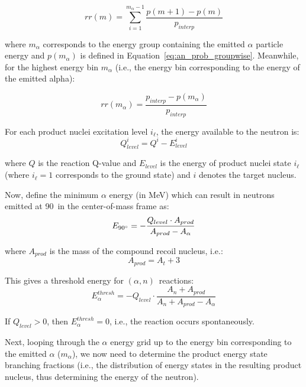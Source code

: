 \documentclass[10pt]{article}
\newcommand{\alphn}[0]{$\left(\alpha,n\right)$}
\begin{document}
\begin{equation}
rr\left(m\right) = \sum_{i=1}^{m_\alpha-1} \frac{ p\left(m+1\right) - p\left(m\right) }{p_{interp}} 
\end{equation}

where $m_\alpha$ corresponds to the energy group containing the emitted $\alpha$ particle energy and $p\left(m_\alpha\right)$ is defined in Equation~\eqref{eq:an_prob_groupwise}. Meanwhile, for the highest energy bin $m_\alpha$ (i.e., the energy bin corresponding to the energy of the emitted alpha):

\begin{equation}
rr\left(m_\alpha\right)=\frac{p_{interp} - p\left( m_\alpha\right) }{p_{interp}}
\end{equation}

For each product nuclei excitation level $i_\ell$, the energy available to the neutron is:
\begin{equation}
Q_{level}^i = Q^i-E^i_{level}
\end{equation}

where $Q$ is the reaction Q-value and $E_{level}$ is the energy of product nuclei state $i_\ell$ (where $i_\ell=1$ corresponds to the ground state) and $i$ denotes the target nucleus.

Now, define the minimum $\alpha$ energy (in MeV) which can result in neutrons emitted at 90\degree\ in the center-of-mass frame as:
\begin{equation}
E_{90\degree} = -\frac{Q_{level} \cdot A_{prod}}{A_{prod}-A_\alpha} 
\end{equation}

where $A_{prod}$ is the mass of the compound recoil nucleus, i.e.:
\begin{equation}
A_{prod} =  A_t + 3
\end{equation}

This gives a threshold energy for \alphn\ reactions:
\begin{equation}
E_\alpha^{thresh} = - Q_{level} \cdot \frac{ A_n + A_{prod}}{A_n + A_{prod} - A_\alpha} 
\end{equation}


If $Q_{level} > 0$, then $E_\alpha^{thresh}=0$, i.e., the reaction occurs spontaneously.

Next, looping through the $\alpha$ energy grid up to the energy bin corresponding to the emitted $\alpha$ ($m_\alpha$), we now need to determine the product energy state branching fractions (i.e., the distribution of energy states in the resulting product nucleus, thus determining the energy of the neutron).
\end{document}
